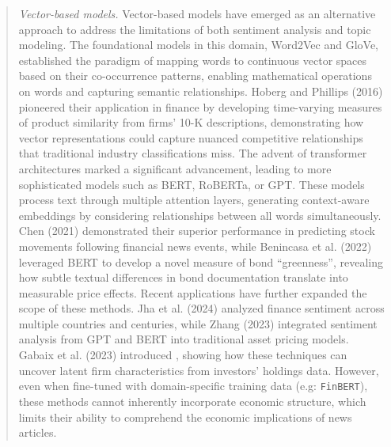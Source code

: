\begin{quote}
\hspace{0.5cm} \textit{Vector-based models.} 
Vector-based models have emerged as an alternative approach to address the limitations of both sentiment analysis and topic modeling. The foundational models in this domain, Word2Vec and GloVe, established the paradigm of mapping words to continuous vector spaces based on their co-occurrence patterns, enabling mathematical operations on words and capturing semantic relationships.
\cite{hoberg2016text}  Hoberg and Phillips (2016) 
pioneered their application in finance by developing time-varying measures of product similarity from firms' 10-K descriptions, demonstrating how vector representations could capture nuanced competitive relationships that traditional industry classifications miss.
%
The advent of transformer architectures marked a significant advancement, leading to more sophisticated models such as BERT, RoBERTa, or GPT. These models process text through multiple attention layers, generating context-aware embeddings by considering relationships between all words simultaneously. 
\cite{chen2021stock}  Chen (2021) 
demonstrated their superior performance in predicting stock movements following financial news events, while 
\cite{benincasa2022different}  Benincasa et al. (2022) 
leveraged BERT to develop a novel measure of bond ``greenness'', revealing how subtle textual differences in bond documentation translate into measurable price effects.
%
Recent applications have further expanded the scope of these methods. 
\cite{jha2022does}  Jha et al. (2024) 
analyzed finance sentiment across multiple countries and centuries, while 
\cite{zhang2023feel}  Zhang (2023) 
integrated sentiment analysis from GPT and BERT into traditional asset pricing models. 
\cite{gabaix2023asset}  Gabaix et al. (2023) 
introduced , showing how these techniques can uncover latent firm characteristics from investors' holdings data. However, even when fine-tuned with domain-specific training data (e.g: \texttt{FinBERT}), these methods cannot inherently incorporate economic structure, which limits their ability to comprehend the economic implications of news articles.
\end{quote}

